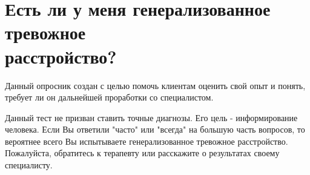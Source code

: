 \documentclass{survey}
\begin{document}
\section*{\huge{Есть ли у меня генерализованное тревожное \\ расстройство?}}

\begin{flushleft}
Данный опросник создан с целью помочь клиентам оценить свой опыт и понять, требует ли он дальнейшей проработки со специалистом.
\end{flushleft}







\begin{flushleft}
Данный тест не призван ставить точные диагнозы. Его цель - информирование человека. Если Вы ответили "часто" или "всегда" на большую часть вопросов, то вероятнее всего Вы испытываете генерализованное тревожное расстройство. Пожалуйста, обратитесь к терапевту или расскажите о результатах своему специалисту.
\end{flushleft}
\end{document}
